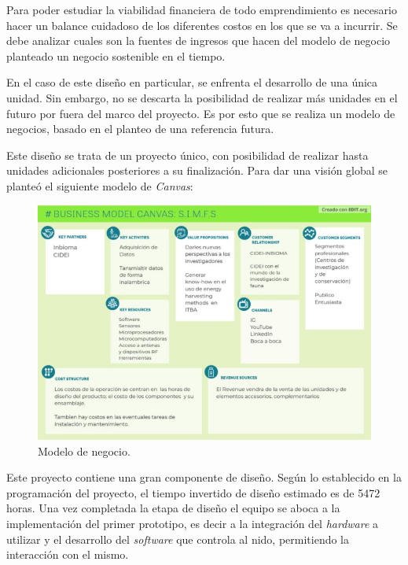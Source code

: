 Para poder estudiar la viabilidad financiera de todo emprendimiento es necesario hacer un balance cuidadoso de los diferentes costos en los que se va a incurrir. Se debe analizar cuales son la fuentes de ingresos que hacen del modelo de negocio planteado un negocio sostenible en el tiempo.

En el caso de este diseño en particular, se enfrenta el desarrollo de una única unidad. Sin embargo, no se descarta la posibilidad de realizar más unidades en el futuro por fuera del marco del proyecto. Es por esto que se realiza un modelo de negocios, basado en el planteo de una referencia futura. 

Este diseño se trata de un proyecto único, con posibilidad de realizar hasta \unidadespostfin unidades adicionales posteriores a su finalización. Para dar una visión global se planteó el siguiente modelo de \textit{Canvas}:
\begin{figure}[H]
	\centering
	\includegraphics[scale=0.7]{../Factibilidad/ImagenesFactibilidad/ModeloDeCanvas}
	\caption{Modelo de negocio.}
	\label{fig:modelodecanvas}
\end{figure}

Este proyecto contiene una gran componente de diseño. Según lo establecido en la programación del proyecto, el tiempo invertido de diseño estimado es de 5472 horas. %
Una vez completada la etapa de diseño el equipo se aboca a la implementación del primer prototipo, es decir a la integración del \textit{hardware} a utilizar y el desarrollo del \textit{software} que controla al nido, permitiendo la interacción con el mismo. 

